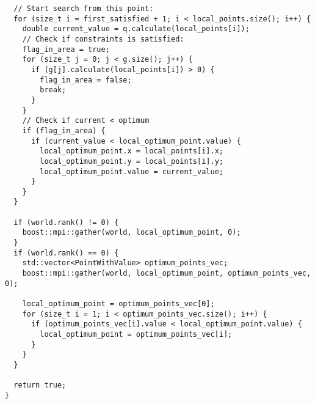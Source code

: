 \documentclass[12pt]{article}
\begin{document}
\begin{verbatim}
  // Start search from this point:
  for (size_t i = first_satisfied + 1; i < local_points.size(); i++) {
    double current_value = q.calculate(local_points[i]);
    // Check if constraints is satisfied:
    flag_in_area = true;
    for (size_t j = 0; j < g.size(); j++) {
      if (g[j].calculate(local_points[i]) > 0) {
        flag_in_area = false;
        break;
      }
    }
    // Check if current < optimum
    if (flag_in_area) {
      if (current_value < local_optimum_point.value) {
        local_optimum_point.x = local_points[i].x;
        local_optimum_point.y = local_points[i].y;
        local_optimum_point.value = current_value;
      }
    }
  }

  if (world.rank() != 0) {
    boost::mpi::gather(world, local_optimum_point, 0);
  }
  if (world.rank() == 0) {
    std::vector<PointWithValue> optimum_points_vec;
    boost::mpi::gather(world, local_optimum_point, optimum_points_vec, 0);

    local_optimum_point = optimum_points_vec[0];
    for (size_t i = 1; i < optimum_points_vec.size(); i++) {
      if (optimum_points_vec[i].value < local_optimum_point.value) {
        local_optimum_point = optimum_points_vec[i];
      }
    }
  }

  return true;
}
\end{verbatim}
\end{document}
